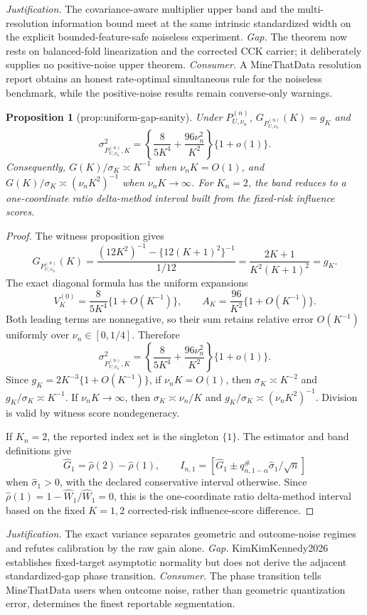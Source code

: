\documentclass{article}
\newtheorem{proposition}{Proposition}
\begin{document}
\par\smallskip\noindent \textit{Justification.} The covariance-aware multiplier upper band and the multi-resolution information bound meet at the same intrinsic standardized width on the explicit bounded-feature-safe noiseless experiment. \textit{Gap.} The theorem now rests on balanced-fold linearization and the corrected CCK carrier; it deliberately supplies no positive-noise upper theorem. \textit{Consumer.} A MineThatData resolution report obtains an honest rate-optimal simultaneous rule for the noiseless benchmark, while the positive-noise results remain converse-only warnings.

\begin{proposition}[prop:uniform-gap-sanity]\label{prop:uniform-gap-sanity}
Under \(P_{U,\nu_n}^{(n)}\), \(G_{P_{U,\nu_n}^{(n)}}(K)=g_K\) and \[\sigma_{P_{U,\nu_n}^{(n)},K}^2=\left\{\frac{8}{5K^4}+\frac{96\nu_n^2}{K^2}\right\}\{1+o(1)\}.\] Consequently, \(G(K)/\sigma_K\asymp K^{-1}\) when \(\nu_nK=O(1)\), and \(G(K)/\sigma_K\asymp(\nu_nK^2)^{-1}\) when \(\nu_nK\to\infty\). For \(K_n=2\), the band reduces to a one-coordinate ratio delta-method interval built from the fixed-risk influence scores.
\end{proposition}
\begin{proof}
The witness proposition gives
\[
 G_{P_{U,\nu_n}^{(n)}}(K)
 =\frac{(12K^2)^{-1}-\{12(K+1)^2\}^{-1}}{1/12}
 =\frac{2K+1}{K^2(K+1)^2}=g_K.
\]
The exact diagonal formula has the uniform expansions
\[
 V_K^{(0)}=\frac8{5K^4}\{1+O(K^{-1})\},\qquad
 A_K=\frac{96}{K^2}\{1+O(K^{-1})\}.
\]
Both leading terms are nonnegative, so their sum retains relative error \(O(K^{-1})\) uniformly over \(\nu_n\in[0,1/4]\).  Therefore
\[
 \sigma_{P_{U,\nu_n}^{(n)},K}^2
 =\left\{\frac8{5K^4}+\frac{96\nu_n^2}{K^2}\right\}\{1+o(1)\}.
\]
Since \(g_K=2K^{-3}\{1+O(K^{-1})\}\), if \(\nu_nK=O(1)\), then \(\sigma_K\asymp K^{-2}\) and \(g_K/\sigma_K\asymp K^{-1}\).  If \(\nu_nK\to\infty\), then \(\sigma_K\asymp\nu_n/K\) and \(g_K/\sigma_K\asymp(\nu_nK^2)^{-1}\).  Division is valid by witness score nondegeneracy.

If \(K_n=2\), the reported index set is the singleton \(\{1\}\).  The estimator and band definitions give
\[
 \widehat G_1=\widehat\rho(2)-\widehat\rho(1),\qquad
 I_{n,1}=[\widehat G_1\pm q_{n,1-\alpha}^{\#}\widehat\sigma_1/\sqrt n]
\]
when \(\widehat\sigma_1>0\), with the declared conservative interval otherwise.  Since \(\widehat\rho(1)=1-\widehat W_1/\widehat W_1=0\), this is the one-coordinate ratio delta-method interval based on the fixed \(K=1,2\) corrected-risk influence-score difference.
\end{proof}
\par\smallskip\noindent \textit{Justification.} The exact variance separates geometric and outcome-noise regimes and refutes calibration by the raw gain alone. \textit{Gap.} KimKimKennedy2026 establishes fixed-target asymptotic normality but does not derive the adjacent standardized-gap phase transition. \textit{Consumer.} The phase transition tells MineThatData users when outcome noise, rather than geometric quantization error, determines the finest reportable segmentation.
\end{document}
